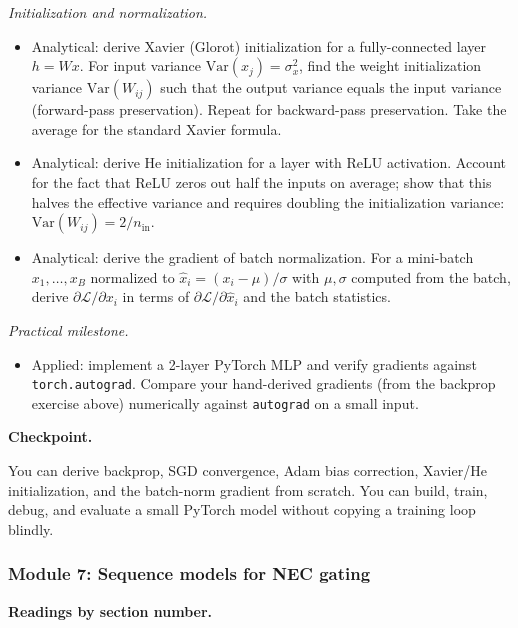 \emph{Initialization and normalization.}

\begin{itemize}
\tightlist
\item
  Analytical: derive Xavier (Glorot) initialization for a
  fully-connected layer \(h = Wx\). For input variance
  \(\text{Var}(x_j) = \sigma_x^2\), find the weight initialization
  variance \(\text{Var}(W_{ij})\) such that the output variance equals
  the input variance (forward-pass preservation). Repeat for
  backward-pass preservation. Take the average for the standard Xavier
  formula.
\item
  Analytical: derive He initialization for a layer with ReLU activation.
  Account for the fact that ReLU zeros out half the inputs on average;
  show that this halves the effective variance and requires doubling the
  initialization variance: \(\text{Var}(W_{ij}) = 2/n_{\text{in}}\).
\item
  Analytical: derive the gradient of batch normalization. For a
  mini-batch \(x_1, \ldots, x_B\) normalized to
  \(\hat{x}_i = (x_i - \mu)/\sigma\) with \(\mu, \sigma\) computed from
  the batch, derive \(\partial \mathcal{L} / \partial x_i\) in terms of
  \(\partial \mathcal{L} / \partial \hat{x}_i\) and the batch
  statistics.
\end{itemize}

\emph{Practical milestone.}

\begin{itemize}
\tightlist
\item
  Applied: implement a 2-layer PyTorch MLP and verify gradients against
  \texttt{torch.autograd}. Compare your hand-derived gradients (from the
  backprop exercise above) numerically against \texttt{autograd} on a
  small input.
\end{itemize}

\textbf{Checkpoint.}

You can derive backprop, SGD convergence, Adam bias correction,
Xavier/He initialization, and the batch-norm gradient from scratch. You
can build, train, debug, and evaluate a small PyTorch model without
copying a training loop blindly.

\subsubsection{Module 7: Sequence models for NEC
gating}\label{module-7-sequence-models-for-nec-gating}

\textbf{Readings by section number.}

